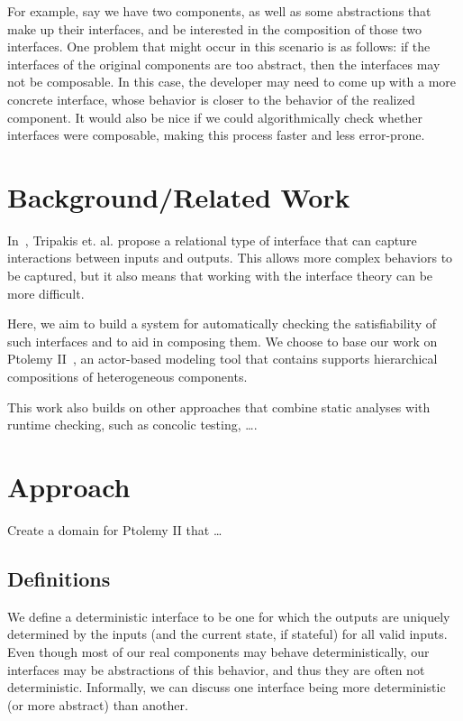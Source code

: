 \documentclass[preprint,11pt,authoryear]{sigplanconf}
\begin{document}
For example, say we have two components, as well as some abstractions that make up their interfaces, and be interested in the composition of those two interfaces.  One problem that might occur in this scenario is as follows: if the interfaces of the original components are too abstract, then the interfaces may not be composable.  In this case, the developer may need to come up with a more concrete interface, whose behavior is closer to the behavior of the realized component.  It would also be nice if we could algorithmically check whether interfaces were composable, making this process faster and less error-prone.

\section{Background/Related Work}
In~\cite{relationalInterfaces}, Tripakis et. al. propose a relational type of interface that can capture interactions between inputs and outputs.  This allows more complex behaviors to be captured, but it also means that working with the interface theory can be more difficult.

Here, we aim to build a system for automatically checking the satisfiability of such interfaces and to aid in composing them.  We choose to base our work on Ptolemy II~\cite{ptII}, an actor-based modeling tool that contains supports hierarchical compositions of heterogeneous components.


This work also builds on other approaches that combine static analyses with runtime checking, such as
concolic testing, \dots {}.

\section{Approach}
Create a domain for Ptolemy II that \dots

\subsection{Definitions}
We define a deterministic interface to be one for which the outputs are uniquely determined by the inputs (and the current state, if stateful) for all valid inputs.  Even though most of our real components may behave deterministically, our interfaces may be abstractions of this behavior, and thus they are often not deterministic.  Informally, we can discuss one interface being more deterministic (or more abstract) than another.
\end{document}

